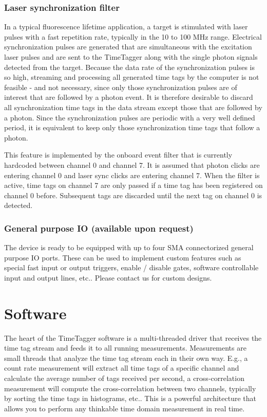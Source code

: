 \documentclass[oneside]{memoir}
\begin{document}
\subsection{Laser synchronization filter}

In a typical fluorescence lifetime application, a target is stimulated with laser pulses with
a fast repetition rate, typically in the 10 to 100 MHz range. Electrical synchronization pulses
are generated that are simultaneous with the excitation laser pulses and are sent to
the TimeTagger along with the single photon signals detected from the target. Because the
data rate of the synchronization pulses is so high, streaming and processing all generated
time tags by the computer is not feasible - and not necessary, since only those synchronization
pulses are of interest that are followed by a photon event. It is therefore desirable
to discard all synchronization time tags in the data stream except those that are followed by a photon.
Since the synchronization pulses are periodic with a very well defined period, it is equivalent
to keep only those synchronization time tags that follow a photon.

This feature is implemented by the onboard event filter that is currently hardcoded between
channel 0 and channel 7. It is assumed that photon clicks are entering channel 0 and laser sync clicks
are entering channel 7. When the filter is active, time tags on channel 7 are only passed
if a time tag has been registered on channel 0 before. Subsequent tags are discarded until the next
tag on channel 0 is detected.

\subsection{General purpose IO (available upon request)}

The device is ready to be equipped with up to four SMA connectorized general purpose IO ports. These can be used
to implement custom features such as special fast input or output triggers, enable / disable gates,
software controllable input and output lines, etc.. Please contact us for custom designs.

\chapter{Software}

The heart of the TimeTagger software is a multi-threaded driver
that receives the time tag stream and feeds it to all running
measurements. Measurements are small threads that analyze the time tag stream
each in their own way. E.g., a count rate measurement will extract all time
tags of a specific channel and calculate the average number of tags received per
second, a cross-correlation measurement will compute the cross-correlation between two
channels, typically by sorting the time tags in histograms, etc.. This is a
powerful architecture that allows you to perform any thinkable time domain
measurement in real time.
\end{document}
